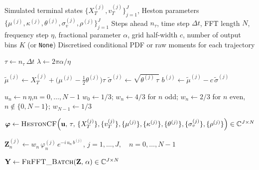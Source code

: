 \begin{algorithm}[H]
    \label{alg:heston_pdf}
\caption{Heston PDF via Fractional FFT and Gil-Pelaez Inversion}
\begin{algorithmic}[1]
\REQUIRE Simulated terminal states $\{X_{T}^{(j)}, v_{T}^{(j)}\}_{j=1}^{J}$,
         Heston parameters $\{\mu^{(j)}, \kappa^{(j)}, \theta^{(j)},
         \sigma_v^{(j)}, \rho^{(j)}\}_{j=1}^{J}$
\REQUIRE Steps ahead $n_{\tau}$, time step $\Delta t$,
         FFT length $N$, frequency step $\eta$,
         fractional parameter $\alpha$, grid half-width $c$,
         number of output bins $K$ (or \texttt{None})
\ENSURE  Discretised conditional PDF or raw moments for each trajectory

\STATE $\tau \leftarrow n_{\tau}\,\Delta t$
\STATE $\lambda \leftarrow 2\pi\alpha / \eta$

    \STATE $\tilde{\mu}^{(j)}   \leftarrow X_{T}^{(j)}
           + \bigl(\mu^{(j)} - \tfrac{1}{2}\theta^{(j)}\bigr)\tau$
    \STATE $\tilde{\sigma}^{(j)} \leftarrow \sqrt{\theta^{(j)}\,\tau}$
    \STATE $b^{(j)} \leftarrow \tilde{\mu}^{(j)} - c\,\tilde{\sigma}^{(j)}$
\ENDFOR

\STATE $u_n \leftarrow n\,\eta$,\quad $n = 0, \ldots, N-1$
\STATE $w_0 \leftarrow 1/3$;\quad
       $w_n \leftarrow 4/3$ for $n$ odd;\quad
       $w_n \leftarrow 2/3$ for $n$ even, $n \notin \{0, N-1\}$;\quad
       $w_{N-1} \leftarrow 1/3$

\STATE $\boldsymbol{\varphi} \leftarrow
       \textsc{HestonCF}\!\left(
         \mathbf{u},\,\tau,\,
         \{X_{T}^{(j)}\},\{v_{T}^{(j)}\},
         \{\mu^{(j)}\},\{\kappa^{(j)}\},\{\theta^{(j)}\},\{\sigma_v^{(j)}\},\{\rho^{(j)}\}
       \right)
       \in \mathbb{C}^{J \times N}$

\STATE $\mathbf{Z}^{(j)}_n \leftarrow
       w_n\,\varphi^{(j)}_n\,
       e^{-i\,u_n\,b^{(j)}}$,\quad
       $j = 1,\ldots,J,\quad n = 0,\ldots,N-1$

\STATE $\mathbf{Y} \leftarrow
       \textsc{FrFFT\_Batch}\!\left(\mathbf{Z},\,\alpha\right)
       \in \mathbb{C}^{J \times N}$


\end{algorithmic}
\end{algorithm}
